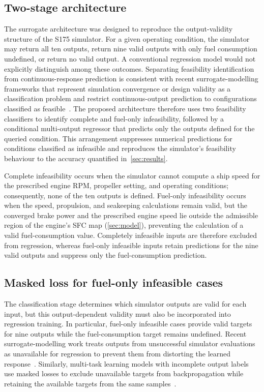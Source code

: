 \documentclass[final,5p,times,twocolumn,numbers]{elsarticle}
\begin{document}
\subsection{Two-stage architecture}

The surrogate architecture was designed to reproduce the output-validity structure of the S175 simulator. For a given operating condition, the simulator may return all ten outputs, return nine valid outputs with only fuel consumption undefined, or return no valid output. A conventional regression model would not explicitly distinguish among these outcomes. Separating feasibility identification from continuous-response prediction is consistent with recent surrogate-modelling frameworks that represent simulation convergence or design validity as a classification problem and restrict continuous-output prediction to configurations classified as feasible~\cite{durkin2024feasibility,aghayev2025classification,mahajan2025feasibility}. The proposed architecture therefore uses two feasibility classifiers to identify complete and fuel-only infeasibility, followed by a conditional multi-output regressor that predicts only the outputs defined for the queried condition. This arrangement suppresses numerical predictions for conditions classified as infeasible and reproduces the simulator's feasibility behaviour to the accuracy quantified in~\autoref{sec:results}.

Complete infeasibility occurs when the simulator cannot compute a ship speed for the prescribed engine RPM, propeller setting, and operating conditions; consequently, none of the ten outputs is defined. Fuel-only infeasibility occurs when the speed, propulsion, and seakeeping calculations remain valid, but the converged brake power and the prescribed engine speed lie outside the admissible region of the engine's SFC map (\autoref{sec:model}), preventing the calculation of a valid fuel-consumption value. Completely infeasible inputs are therefore excluded from regression, whereas fuel-only infeasible inputs retain predictions for the nine valid outputs and suppress only the fuel-consumption prediction.


\subsection{Masked loss for fuel-only infeasible cases}

The classification stage determines which simulator outputs are valid for each input, but this output-dependent validity must also be incorporated into regression training. In particular, fuel-only infeasible cases provide valid targets for nine outputs while the fuel-consumption target remains undefined. Recent surrogate-modelling work treats outputs from unsuccessful simulator evaluations as unavailable for regression to prevent them from distorting the learned response~\cite{durkin2024feasibility}. Similarly, multi-task learning models with incomplete output labels use masked losses to exclude unavailable targets from backpropagation while retaining the available targets from the same samples~\cite{peteani2024masked}.
\end{document}
